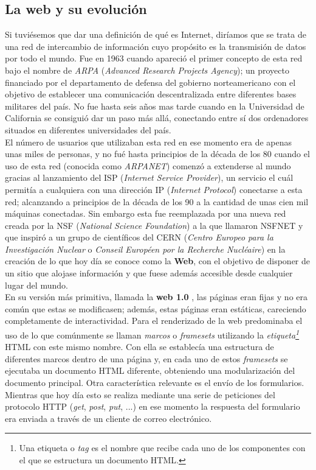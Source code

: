 \documentclass[../main.tex]{subfiles}
\begin{document}
    \subsection{La web y su evolución}
    Si tuviésemos que dar una definición de qué es Internet, diríamos que se trata de una red de intercambio de información cuyo propósito es la transmisión de datos por todo el mundo. Fue en 1963 cuando apareció el primer concepto de esta red bajo el nombre de \textit{ARPA} (\textit{Advanced Research Projects Agency}); un proyecto financiado por el departamento de defensa del gobierno norteamericano con el objetivo de establecer una comunicación descentralizada entre diferentes bases militares del país. No fue hasta seis años mas tarde cuando en la Universidad de California se consiguió dar un paso más allá, conectando entre sí dos ordenadores situados en diferentes universidades del país. \\
    
    El número de usuarios que utilizaban esta red en ese momento era de apenas unas miles de personas, y no fué hasta principios de la década de los 80 cuando el uso de esta red (conocida como \textit{ARPANET}) comenzó a extenderse al mundo gracias al lanzamiento del ISP (\textit{Internet Service Provider}), un servicio el cuál permitía a cualquiera con una dirección IP (\textit{Internet Protocol}) conectarse a esta red; alcanzando a principios de la década de los 90 a la cantidad de unas cien mil máquinas conectadas. Sin embargo esta fue reemplazada por una nueva red creada por la NSF (\textit{National Science Foundation}) a la que llamaron NSFNET y que inspiró a un grupo de científicos del CERN (\textit{Centro Europeo para la Investigación Nuclear} o \textit{Conseil Européen por la Recherche Nucléaire}) en la creación de lo que hoy día se conoce como la \textbf{Web}, con el objetivo de disponer de un sitio que alojase información y que fuese además accesible desde cualquier lugar del mundo.\\ 
    
    
    En su versión más primitiva, llamada la \textbf{web 1.0} \cite{web1.0}, las páginas eran fijas y no era común que estas se modificasen; además, estas páginas eran estáticas, careciendo completamente de interactividad. Para el renderizado de la web predominaba el uso de lo que comúnmente se llaman \textit{marcos} o \textit{framesets} utilizando la \textit{etiqueta\footnote{Una etiqueta o \textit{tag} es el nombre que recibe cada uno de los componentes con el que se estructura un documento HTML.}} HTML con este mismo nombre. Con ella se establecía una estructura de diferentes marcos dentro de una página y, en cada uno de estos \textit{framesets} se ejecutaba un documento HTML diferente, obteniendo una modularización del documento principal. Otra característica relevante es el envío de los formularios. Mientras que hoy día esto se realiza mediante una serie de peticiones del protocolo HTTP (\textit{get}, \textit{post}, \textit{put}, ...) en ese momento la respuesta del formulario era enviada a través de un cliente de correo electrónico.\\
     
\end{document}
